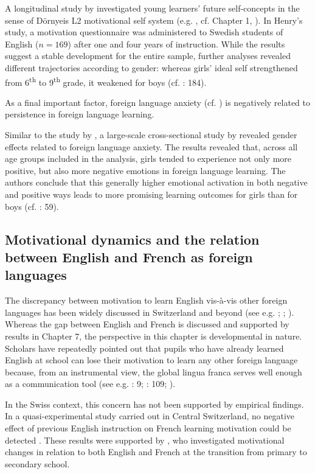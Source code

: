 \documentclass[output=paper]{langsci/langscibook}
\begin{document}
A longitudinal study by \citet{Henry2009} investigated young learners’ future self-concepts in the sense of Dörnyeis L2 motivational self system (e.g. \citealt{Doernyei2009}, cf. Chapter 1, ). In Henry’s study, a motivation questionnaire was administered to Swedish students of English ($n=169$) after one and four years of instruction. While the results suggest a stable development for the entire sample, further analyses revealed different trajectories according to gender: whereas girls’ ideal self strengthened from 6\textsuperscript{th} to 9\textsuperscript{th} grade, it weakened for boys (cf. \citealt{Henry2009}: 184). 

As a final important factor, foreign language anxiety (cf. \citealt{MacIntyre1999}) is negatively related to persistence in foreign language learning.

Similar to the study by \citet{Henry2009}, a large-scale cross-sectional study by \citet{DewaeleEtAl2016} revealed gender effects related to foreign language anxiety. The results revealed that, across all age groups included in the analysis, girls tended to experience not only more positive, but also more negative emotions in foreign language learning. The authors conclude that this generally higher emotional activation in both negative and positive ways leads to more promising learning outcomes for girls than for boys (cf. \citealt{DewaeleEtAl2016}: 59).

\subsection{Motivational dynamics and the relation between English and French as foreign languages}

The discrepancy between motivation to learn English vis-à-vis other foreign languages has been widely discussed in Switzerland and beyond (see e.g. \citealt{BuylHousen2014}; \citealt{Ushioda2017}; \citealt{Busse2017}). Whereas the gap between English and French is discussed and supported by results in Chapter 7, the perspective in this chapter is developmental in nature. Scholars have repeatedly pointed out that pupils who have already learned English at school can lose their motivation to learn any other foreign language because, from an instrumental view, the global lingua franca serves well enough as a communication tool (see e.g. \citealt{Hufeisen2003}: 9; \citealt{MeissnerEtAl2008}: 109; \citealt{Ushioda2017}).

In the Swiss context, this concern has not been supported by empirical findings. In a quasi-experimental study carried out in Central Switzerland, no negative effect of previous English instruction on French learning motivation could be detected \citep{Heinzmann2010}. These results were supported by \citet[176]{BruehwilerLePapeRacine2017}, who investigated motivational changes in relation to both English and French at the transition from primary to secondary school. 
\end{document}
